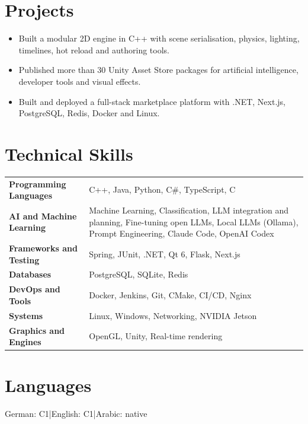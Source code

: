 \documentclass[10pt,a4paper]{article}
\begin{document}
\section{Projects}
\begin{itemize}
  \item Built a modular 2D engine in C++ with scene serialisation, physics, lighting, timelines, hot reload and authoring tools.
  \item Published more than 30 Unity Asset Store packages for artificial intelligence, developer tools and visual effects.
  \item Built and deployed a full-stack marketplace platform with .NET, Next.js, PostgreSQL, Redis, Docker and Linux.
\end{itemize}

\section{Technical Skills}
{\small\renewcommand{\arraystretch}{1.15}
\begin{tabularx}{\linewidth}{@{}>{\bfseries}p{4.6cm}X@{}}
Programming Languages & C++, Java, Python, C\#, TypeScript, C \\
AI and Machine Learning & Machine Learning, Classification, LLM integration and planning, Fine-tuning open LLMs, Local LLMs (Ollama), Prompt Engineering, Claude Code, OpenAI Codex \\
Frameworks and Testing & Spring, JUnit, .NET, Qt 6, Flask, Next.js \\
Databases & PostgreSQL, SQLite, Redis \\
DevOps and Tools & Docker, Jenkins, Git, CMake, CI/CD, Nginx \\
Systems & Linux, Windows, Networking, NVIDIA Jetson \\
Graphics and Engines & OpenGL, Unity, Real-time rendering \\
\end{tabularx}\par}

\section{Languages}
{\small German: C1\enspace\textcolor{rule}{|}\enspace English: C1\enspace\textcolor{rule}{|}\enspace Arabic: native\par}
\end{document}
